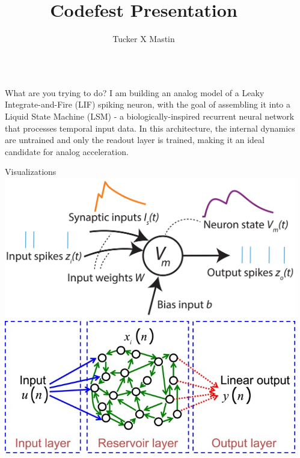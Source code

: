 \documentclass[final]{beamer}
\title{Codefest Presentation}
\author{Tucker X Mastin}
\institute[shortinst]{Department of Electrical and Computer Engineering, Portland State University}
\date{}
\newlength{\sepwidth}
\newlength{\colwidth}
\newcommand{\separatorcolumn}{\begin{column}{\sepwidth}\end{column}}
\begin{document}
\begin{frame}[t]


\vspace{1cm}

\begin{columns}[t]

\separatorcolumn

\begin{column}{\colwidth}

\begin{block}{What are you trying to do?}
I am building an analog model of a Leaky Integrate-and-Fire (LIF) spiking neuron, with the goal of assembling it into a Liquid State Machine (LSM) - a biologically-inspired recurrent neural network that processes temporal input data. In this architecture, the internal dynamics are untrained and only the readout layer is trained, making it an ideal candidate for analog acceleration.
\end{block}

\begin{block}{Visualizations}
\centering
\includegraphics[width=0.9\colwidth]{LIF.png} \\
\vspace{1em}
\includegraphics[width=0.9\colwidth]{LSM.jpg}
\end{block}


\end{column}
\end{columns}
\end{frame}
\end{document}

